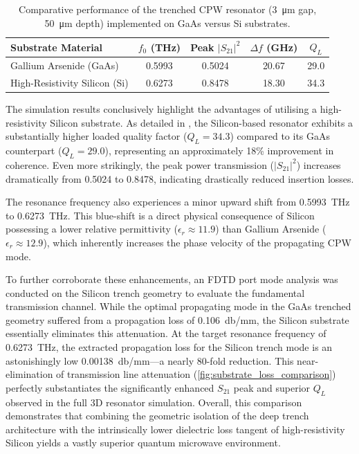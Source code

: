 \documentclass[12pt,a4paper]{article}
\begin{document}
\begin{table}[htbp]
    \centering
    \begin{tabular}{lcccc}
        \toprule
        \textbf{Substrate Material} & \boldmath$f_0$ \textbf{(\si{\tera\hertz})} & \textbf{Peak} \boldmath$|S_{21}|^2$ & \boldmath$\Delta f$ \textbf{(\si{\giga\hertz})} & \boldmath$Q_L$ \\
        \midrule
        Gallium Arsenide (GaAs) & 0.5993 & 0.5024 & 20.67 & 29.0 \\
        High-Resistivity Silicon (Si) & 0.6273 & 0.8478 & 18.30 & 34.3 \\
        \bottomrule
    \end{tabular}
    \caption{Comparative performance of the trenched CPW resonator (\SI{3}{\micro\metre} gap, \SI{50}{\micro\metre} depth) implemented on GaAs versus Si substrates.}
    \label{tab:substrate_comparison}
\end{table}

The simulation results conclusively highlight the advantages of utilising a high-resistivity Silicon substrate. As detailed in , the Silicon-based resonator exhibits a substantially higher loaded quality factor ($Q_L = 34.3$) compared to its GaAs counterpart ($Q_L = 29.0$), representing an approximately 18\% improvement in coherence. Even more strikingly, the peak power transmission ($|S_{21}|^2$) increases dramatically from 0.5024 to 0.8478, indicating drastically reduced insertion losses. 

The resonance frequency also experiences a minor upward shift from \SI{0.5993}{\tera\hertz} to \SI{0.6273}{\tera\hertz}. This blue-shift is a direct physical consequence of Silicon possessing a lower relative permittivity ($\epsilon_r \approx 11.9$) than Gallium Arsenide ($\epsilon_r \approx 12.9$), which inherently increases the phase velocity of the propagating CPW mode. 

To further corroborate these enhancements, an FDTD port mode analysis was conducted on the Silicon trench geometry to evaluate the fundamental transmission channel. While the optimal propagating mode in the GaAs trenched geometry suffered from a propagation loss of \SI{0.106}{\decibel/\milli\metre}, the Silicon substrate essentially eliminates this attenuation. At the target resonance frequency of \SI{0.6273}{\tera\hertz}, the extracted propagation loss for the Silicon trench mode is an astonishingly low \SI{0.00138}{\decibel/\milli\metre}---a nearly 80-fold reduction. This near-elimination of transmission line attenuation (\cref{fig:substrate_loss_comparison}) perfectly substantiates the significantly enhanced $S_{21}$ peak and superior $Q_L$ observed in the full 3D resonator simulation. Overall, this comparison demonstrates that combining the geometric isolation of the deep trench architecture with the intrinsically lower dielectric loss tangent of high-resistivity Silicon yields a vastly superior quantum microwave environment.
\end{document}
